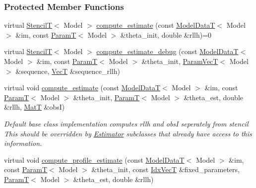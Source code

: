 \subsubsection*{Protected Member Functions}
\begin{DoxyCompactItemize}
\item 
virtual \hyperlink{namespacemappel_a3a06598240007876f8c4bf834ad86197}{StencilT}$<$ Model $>$ \hyperlink{classmappel_1_1Estimator_aa8b8c7f835056c94de1f21bff2ef205b}{compute\+\_\+estimate} (const \hyperlink{namespacemappel_a97f050df953605381ae9c901c3b125f1}{Model\+DataT}$<$ Model $>$ \&im, const \hyperlink{namespacemappel_a667925cb0d6c0e49f2f035cc5a9a6857}{ParamT}$<$ Model $>$ \&theta\+\_\+init, double \&rllh)=0
\item 
virtual \hyperlink{namespacemappel_a3a06598240007876f8c4bf834ad86197}{StencilT}$<$ Model $>$ \hyperlink{classmappel_1_1Estimator_a29c41d423941e8b86add3e493cb1375e}{compute\+\_\+estimate\+\_\+debug} (const \hyperlink{namespacemappel_a97f050df953605381ae9c901c3b125f1}{Model\+DataT}$<$ Model $>$ \&im, const \hyperlink{namespacemappel_a667925cb0d6c0e49f2f035cc5a9a6857}{ParamT}$<$ Model $>$ \&theta\+\_\+init, \hyperlink{namespacemappel_a0f86d3153e4e27b095012f140eea58de}{Param\+VecT}$<$ Model $>$ \&sequence, \hyperlink{namespacemappel_a2225ad69f358daa3f4f99282a35b9a3a}{VecT} \&sequence\+\_\+rllh)
\item 
virtual void \hyperlink{classmappel_1_1Estimator_aa46d86cfb5c336c9cb8c106da036d7d1}{compute\+\_\+estimate} (const \hyperlink{namespacemappel_a97f050df953605381ae9c901c3b125f1}{Model\+DataT}$<$ Model $>$ \&im, const \hyperlink{namespacemappel_a667925cb0d6c0e49f2f035cc5a9a6857}{ParamT}$<$ Model $>$ \&theta\+\_\+init, \hyperlink{namespacemappel_a667925cb0d6c0e49f2f035cc5a9a6857}{ParamT}$<$ Model $>$ \&theta\+\_\+est, double \&rllh, \hyperlink{namespacemappel_a7091ab87c528041f7e2027195fad8915}{MatT} \&obsI)
\begin{DoxyCompactList}\small\item\em Default base class implementation computes rllh and obsI seperately from stencil This should be overridden by \hyperlink{classmappel_1_1Estimator}{Estimator} subclasses that already have access to this information. \end{DoxyCompactList}\item 
virtual void \hyperlink{classmappel_1_1Estimator_a273f65624e06688cd4b1126e3e7556ae}{compute\+\_\+profile\+\_\+estimate} (const \hyperlink{namespacemappel_a97f050df953605381ae9c901c3b125f1}{Model\+DataT}$<$ Model $>$ \&im, const \hyperlink{namespacemappel_a667925cb0d6c0e49f2f035cc5a9a6857}{ParamT}$<$ Model $>$ \&theta\+\_\+init, const \hyperlink{namespacemappel_ac63743dcd42180127307cd0e4ecdd784}{Idx\+VecT} \&fixed\+\_\+parameters, \hyperlink{namespacemappel_a667925cb0d6c0e49f2f035cc5a9a6857}{ParamT}$<$ Model $>$ \&theta\+\_\+est, double \&rllh)

\end{DoxyCompactItemize}
